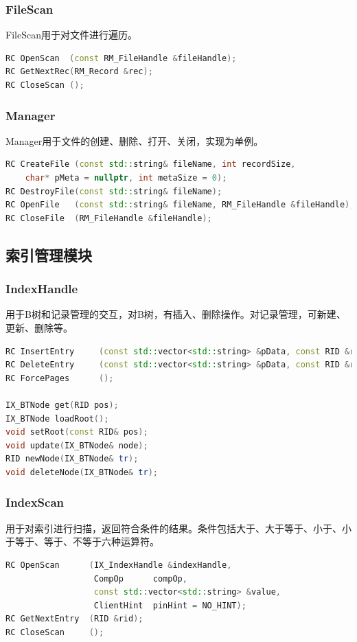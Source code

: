 \documentclass{article}
\begin{document}
\subsubsection{FileScan}
FileScan用于对文件进行遍历。
\begin{lstlisting}[language=C++]
RC OpenScan  (const RM_FileHandle &fileHandle);
RC GetNextRec(RM_Record &rec);
RC CloseScan ();
\end{lstlisting}
\subsubsection{Manager}
Manager用于文件的创建、删除、打开、关闭，实现为单例。
\begin{lstlisting}[language=C++]
RC CreateFile (const std::string& fileName, int recordSize,
    char* pMeta = nullptr, int metaSize = 0);
RC DestroyFile(const std::string& fileName);
RC OpenFile   (const std::string& fileName, RM_FileHandle &fileHandle);
RC CloseFile  (RM_FileHandle &fileHandle);
\end{lstlisting}
\subsection{索引管理模块}
\subsubsection{IndexHandle}
用于B树和记录管理的交互，对B树，有插入、删除操作。对记录管理，可新建、更新、删除等。
\begin{lstlisting}[language=C++]
RC InsertEntry     (const std::vector<std::string> &pData, const RID &rid);
RC DeleteEntry     (const std::vector<std::string> &pData, const RID &rid);
RC ForcePages      ();

IX_BTNode get(RID pos);
IX_BTNode loadRoot();
void setRoot(const RID& pos);
void update(IX_BTNode& node);
RID newNode(IX_BTNode& tr);
void deleteNode(IX_BTNode& tr);
\end{lstlisting}
\subsubsection{IndexScan}
用于对索引进行扫描，返回符合条件的结果。条件包括大于、大于等于、小于、小于等于、等于、不等于六种运算符。
\begin{lstlisting}[language=C++]
RC OpenScan      (IX_IndexHandle &indexHandle,
				  CompOp      compOp,
				  const std::vector<std::string> &value,
				  ClientHint  pinHint = NO_HINT);       
RC GetNextEntry  (RID &rid);
RC CloseScan     ();
\end{lstlisting}
\end{document}
